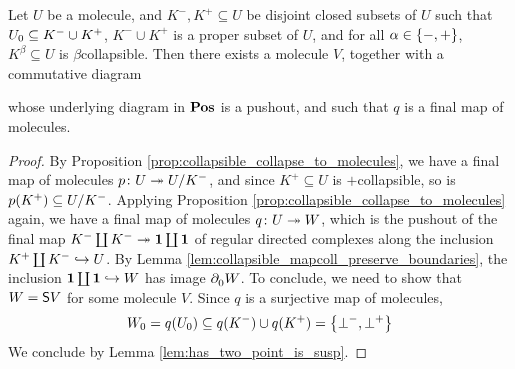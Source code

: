 \begin{prop} \label{prop:desuspension}
    Let \( U \) be a molecule, and \( K^-, K^+ \subseteq U \) be disjoint closed subsets of \( U \) such that \( \gr{0}{U} \subseteq K^- \cup K^+ \), \( K^- \cup K^+ \) is a proper subset of \( U \), and for all \( \a \in \set{-, +} \), \( K^\beta \subseteq U \) is \( \beta \)\nbd collapsible.
    Then there exists a molecule \( V \), together with a commutative diagram
    \begin{center}
    \end{center}
    whose underlying diagram in \( \Pos \) is a pushout, and such that \( q \) is a final map of molecules.
\end{prop}
\begin{proof}
    By Proposition \ref{prop:collapsible_collapse_to_molecules}, we have a final map of molecules \( p \colon U \surj \coll{K^-}{U} \), and since \( K^+ \subseteq U \) is \( + \)\nbd collapsible, so is \( p(K^+) \subseteq \coll{K^-}{U} \).
    Applying Proposition \ref{prop:collapsible_collapse_to_molecules} again, we have a final map of molecules \( q \colon U \surj W \), which is the pushout of the final map \( K^- \coprod K^- \surj \pt \coprod \pt \) of regular directed complexes along the inclusion \( K^+ \coprod K^- \incl U \).
    By Lemma \ref{lem:collapsible_mapcoll_preserve_boundaries}, the inclusion \( \pt \coprod \pt \incl W \) has image \( \bd{0}{} W \).
    To conclude, we need to show that \( W = \sus{V} \) for some molecule \( V \).
    Since \( q \) is a surjective map of molecules, 
    \begin{equation*}
        \gr{0}{W} = q(\gr{0}{U}) \subseteq q(K^-) \cup q(K^+) = \set{\bot^-, \bot^+}
    \end{equation*}
    We conclude by Lemma \ref{lem:has_two_point_is_susp}.
\end{proof}

